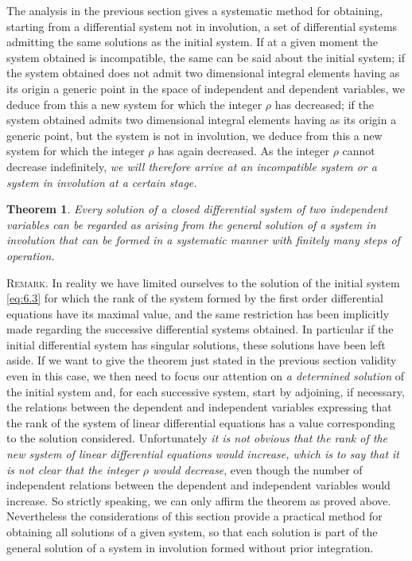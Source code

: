 \documentclass[leqno,11pt]{book}
\numberwithin{equation}{chapter}
\theoremstyle{shape1}
\newtheorem*{thm*}{\hspace{15pt}Theorem}
\theoremstyle{shape0}
\theoremstyle{shape2}
\theoremstyle{definition}
\begin{document}
\vspace{12pt}\fsec The analysis in the previous section gives a systematic method for obtaining, starting from a differential system not in involution, a set of differential systems admitting the same solutions as the initial system. If at a given moment the system obtained is incompatible, the same can be said about the initial system; if the system obtained does not admit two dimensional integral elements having as its origin a generic point in the space of independent and dependent variables, we deduce from this a new system for which the integer $\rho$ has decreased; if the system obtained admits two dimensional integral elements having as its origin a generic point, but the system is not in involution, we deduce from this a new system for which the integer $\rho$ has again decreased. As the integer $\rho$ cannot decrease indefinitely, \emph{we will therefore arrive at an incompatible system or a system in involution at a certain stage.}
\begin{thm*}
  Every solution of a closed differential system of two independent variables can be regarded as arising from the general solution of a system in involution that can be formed in a systematic manner with finitely many steps of operation.
\end{thm*}



\vspace{12pt}\fsec\textsc{Remark.} In reality we have limited ourselves to the solution of the initial system \eqref{eq:6.3} for which the rank of the  system formed by the first order differential equations have its maximal value, and the same restriction has been implicitly made regarding the successive differential systems obtained. In particular if the initial differential system has singular solutions, these solutions have been left aside. If we want to give the theorem just stated in the previous section validity even in this case, we then need to focus our attention on \emph{a determined solution} of the initial system and, for each successive system, start by adjoining, if necessary, the relations between the dependent and independent variables expressing that the rank of the system of linear differential equations has a value corresponding to the solution considered. Unfortunately \emph{it is not obvious that the rank of the new system of linear differential equations would increase, which is to say that it is not clear that the integer $\rho$ would decrease}, even though the number of independent relations between the dependent and independent variables would increase. So strictly speaking, we can only affirm the theorem as proved above. Nevertheless the considerations of this section provide a practical method for obtaining all solutions of a given system, so that each solution is part of the general solution of a system in involution formed without prior integration.
\end{document}

